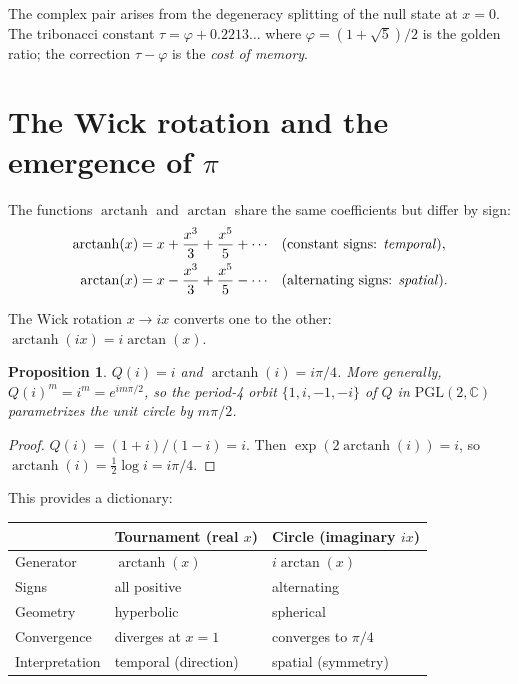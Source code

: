 \documentclass[11pt]{amsart}
\newtheorem{proposition}[theorem]{Proposition}
\theoremstyle{definition}
\DeclareMathOperator{\arctanh}{arctanh}
\DeclareMathOperator{\arctan}{arctan}
\begin{document}
The complex pair arises from the degeneracy splitting of the null state at $x = 0$. The tribonacci constant $\tau = \varphi + 0.2213\ldots$ where $\varphi = (1+\sqrt{5})/2$ is the golden ratio; the correction $\tau - \varphi$ is the \emph{cost of memory}.

\section{The Wick rotation and the emergence of $\pi$}

The functions $\arctanh$ and $\arctan$ share the same coefficients but differ by sign:
\begin{align*}
\arctanh(x) &= x + \frac{x^3}{3} + \frac{x^5}{5} + \cdots && \text{(constant signs: \emph{temporal})}, \\
\arctan(x) &= x - \frac{x^3}{3} + \frac{x^5}{5} - \cdots && \text{(alternating signs: \emph{spatial})}.
\end{align*}

The Wick rotation $x \to ix$ converts one to the other: $\arctanh(ix) = i\arctan(x)$.

\begin{proposition}\label{prop:pi}
$Q(i) = i$ and $\arctanh(i) = i\pi/4$. More generally, $Q(i)^m = i^m = e^{im\pi/2}$, so the period-4 orbit $\{1, i, -1, -i\}$ of $Q$ in $\mathrm{PGL}(2,\mathbb{C})$ parametrizes the unit circle by $m\pi/2$.
\end{proposition}

\begin{proof}
$Q(i) = (1+i)/(1-i) = i$. Then $\exp(2\arctanh(i)) = i$, so $\arctanh(i) = \frac{1}{2}\log i = i\pi/4$.
\end{proof}

This provides a dictionary:
\begin{center}
\renewcommand{\arraystretch}{1.3}
\begin{tabular}{@{}lll@{}}
\toprule
& \textbf{Tournament (real $x$)} & \textbf{Circle (imaginary $ix$)} \\
\midrule
Generator & $\arctanh(x)$ & $i\arctan(x)$ \\
Signs & all positive & alternating \\
Geometry & hyperbolic & spherical \\
Convergence & diverges at $x=1$ & converges to $\pi/4$ \\
Interpretation & temporal (direction) & spatial (symmetry) \\
\bottomrule
\end{tabular}
\end{center}
\end{document}
